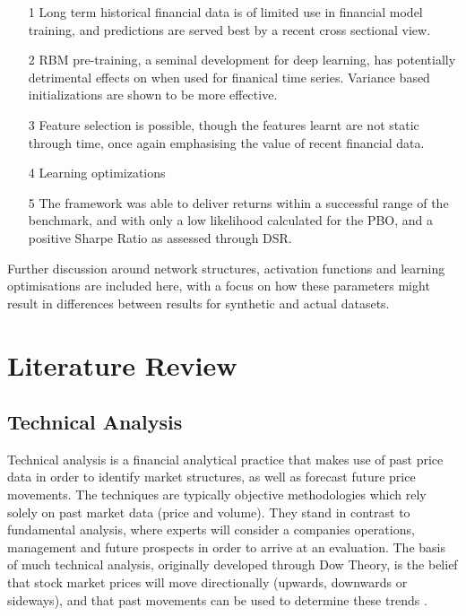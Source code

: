 \documentclass[a4paper,11pt,oneside]{article}
\theoremstyle{plain}
\theoremstyle{definition}
\begin{document}
	\begin{itemize}
		\item[1] Long term historical financial data is of limited use in financial model training, and predictions are served best by a recent cross sectional view.
		\item[2] RBM pre-training, a seminal development for deep learning, has potentially detrimental effects on when used for finanical time series. Variance based initializations are shown to be more effective.
		\item[3] Feature selection is possible, though the features learnt are not static through time, once again emphasising the value of recent financial data.	 
		\item[4] Learning optimizations 
		\item[5] The framework was able to deliver returns within a successful range of the benchmark, and with only a low likelihood calculated for the PBO, and a positive Sharpe Ratio as assessed through DSR.
	\end{itemize}
	Further discussion around network structures, activation functions and learning optimisations are included here, with a focus on how these parameters might result in differences between results for synthetic and actual datasets.
	
	
	\newpage
	\section{Literature Review}\label{lr_LiteratureReview}
	\subsection{Technical Analysis}\label{lr_TechnicalAnalysis}
	
	Technical analysis is a financial analytical practice that makes use of past price data in order to identify market 
	structures, as well as forecast future price movements. The techniques are typically objective methodologies 
	which rely solely on past market data (price and volume). They stand in contrast to fundamental analysis, where 
	experts will consider a companies operations, management and future prospects in order to arrive at an evaluation. 
	The basis of much technical analysis, originally developed through Dow Theory, is the belief that stock market 
	prices will move directionally (upwards, downwards or sideways), and that past movements can be used to 
	determine these trends  \cite {Murphy}.
	\hfill \break 
	
\end{document}
